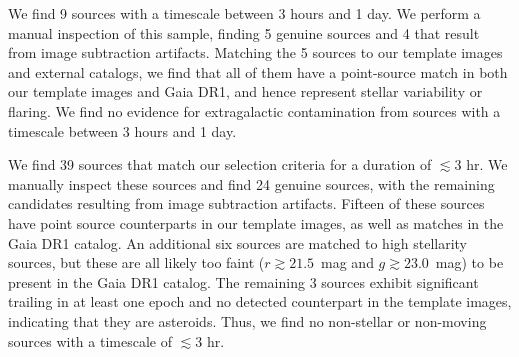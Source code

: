We find 9 sources with a timescale between 3 hours and 1 day. We perform a manual inspection of this sample, finding 5 genuine sources and 4 that result from image subtraction artifacts. Matching the 5 sources to our template images and external catalogs, we find that all of them have a point-source match in both our template images and Gaia DR1, and hence represent stellar variability or flaring. We find no evidence for extragalactic contamination from sources with a timescale between 3 hours and 1 day.

We find 39 sources that match our selection criteria for a duration of $\lesssim 3$ hr. We manually inspect these sources and find 24 genuine sources, with the remaining candidates resulting from image subtraction artifacts. Fifteen of these sources have point source counterparts in our template images, as well as matches in the Gaia DR1 catalog. An additional six sources are matched to high stellarity sources, but these are all likely too faint ($r \gtrsim 21.5$~mag and $g \gtrsim 23.0$~mag) to be present in the Gaia DR1 catalog. The remaining 3 sources exhibit significant trailing in at least one epoch and no detected counterpart in the template images, indicating that they are asteroids. Thus, we find no non-stellar or non-moving sources with a timescale of $\lesssim 3$ hr.


